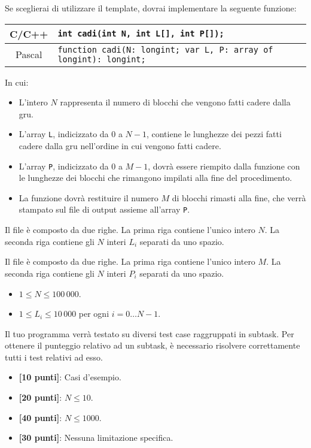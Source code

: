 Se sceglierai di utilizzare il template, dovrai implementare la seguente funzione:
\begin{center}\begin{tabularx}{\textwidth}{|c|X|}
\hline
C/C++  & \verb|int cadi(int N, int L[], int P[]);|\\
\hline
Pascal & \verb|function cadi(N: longint; var L, P: array of longint): longint;|\\
\hline
\end{tabularx}\end{center}
In cui:
\begin{itemize}[nolistsep]
  \item L'intero $N$ rappresenta il numero di blocchi che vengono fatti cadere dalla gru.
  \item L'array \texttt{L}, indicizzato da $0$ a $N-1$, contiene le lunghezze dei pezzi fatti cadere dalla gru nell'ordine in cui vengono fatti cadere.
  \item L'array \texttt{P}, indicizzato da $0$ a $M-1$, dovr\`a essere riempito dalla funzione con le lunghezze dei blocchi che rimangono impilati alla fine del procedimento.
  \item La funzione dovrà restituire il numero $M$ di blocchi rimasti alla fine, che verrà stampato sul file di output assieme all'array \texttt{P}.
\end{itemize}

\InputFile
Il file  è composto da due righe. La prima riga contiene l'unico intero $N$. La seconda riga contiene gli $N$ interi $L_i$ separati da uno spazio.

\OutputFile
Il file \outputfile{} è composto da due righe. La prima riga contiene l'unico intero $M$. La seconda riga contiene gli $N$ interi $P_i$ separati da uno spazio.

\Constraints
\begin{itemize}[nolistsep, itemsep=2mm]
	\item $1 \le N \le 100\,000$.
	\item $1 \le L_i \le 10\,000$ per ogni $i=0\ldots N-1$.
\end{itemize}

\Scoring
Il tuo programma verrà testato su diversi test case raggruppati in subtask.
Per ottenere il punteggio relativo ad un subtask, è necessario risolvere
correttamente tutti i test relativi ad esso.

\begin{itemize}[nolistsep,itemsep=2mm]
  \item \textbf{ [10 punti]}: Casi d'esempio.
  \item \textbf{ [20 punti]}: $N \leq 10$.
  \item \textbf{ [40 punti]}: $N \leq 1000$.
  \item \textbf{ [30 punti]}: Nessuna limitazione specifica.
\end{itemize}

